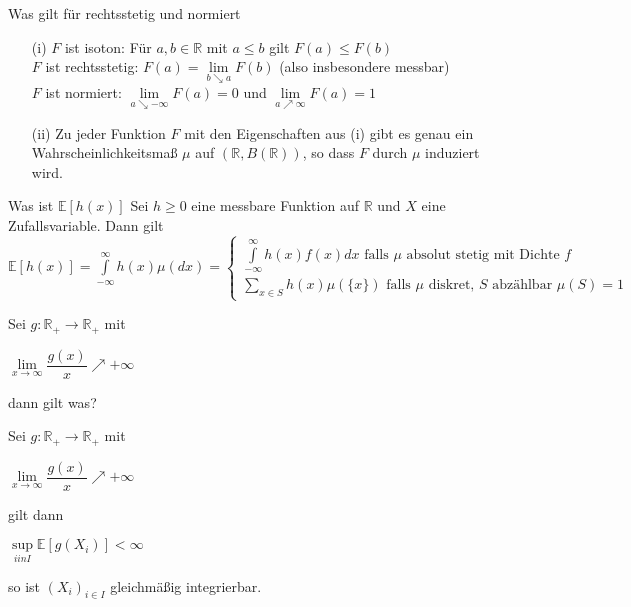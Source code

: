 \documentclass[avery5371,grid,frame]{flashcards} %
\newcommand{\E}{\mathbb{E}}
\newcommand{\R}{\mathbb{R}}
\newcommand{\1}{ \mathbb{1} } %
\begin{document}
\begin{flashcard}[Satz]{Was gilt für rechtsstetig und normiert}
  \begin{itemize}
  \item[(i)] $F$ ist isoton: Für $a,b \in \R$ mit $a \leq b$ gilt $F(a)\leq F(b)$\\
    $F$ ist rechtsstetig: $F(a)=\lim\limits_{b\searrow a}F(b)$ (also insbesondere messbar)\\
    $F$ ist normiert: $\lim\limits_{a\searrow -\infty}F(a)=0$ und
    $\lim\limits_{a\nearrow \infty}F(a)=1$
  \item[(ii)] Zu jeder Funktion $F$ mit den Eigenschaften aus (i) gibt
    es genau ein Wahrscheinlichkeitsmaß $\mu$ auf $(\R,B(\R))$, so dass $F$ durch $\mu$
    induziert wird.
  \end{itemize}
\end{flashcard}

\begin{flashcard}[Satz]{Was ist $\E[h(x)]$}
 Sei $h\geq 0$ eine messbare Funktion auf $\R$ und $X$ eine Zufallsvariable. Dann
  gilt
    $\E[h(x)] = \int\limits_{-\infty}^{\infty} h(x) \mu(dx)
    = \begin{cases}
      \int\limits_{-\infty}^\infty h(x)f(x) dx \text{ falls } \mu \text{ absolut stetig mit Dichte } f\\
      \sum\limits_{x \in S} h(x)\mu(\{x\}) \text{ falls } \mu \text{ diskret, } S \text{ abzählbar } \mu(S)=1
    \end{cases}$
\end{flashcard}

\begin{flashcard}[Satz]{  Sei $g:\R_+ \to \R_+$ mit  \begin{center}    $\lim\limits_{x\to \infty} \dfrac{g(x)}{x}\nearrow +\infty$  \end{center}dann gilt was?}
  Sei $g:\R_+ \to \R_+$ mit
  \begin{center}
    $\lim\limits_{x\to \infty} \dfrac{g(x)}{x}\nearrow +\infty$
  \end{center}
  gilt dann
  \begin{center}
    $\sup\limits_{i in I} \E[g(X_i)]<\infty$
  \end{center}
  so ist $(X_i)_{i \in I}$ gleichmäßig integrierbar.
\end{flashcard}
\end{document}

